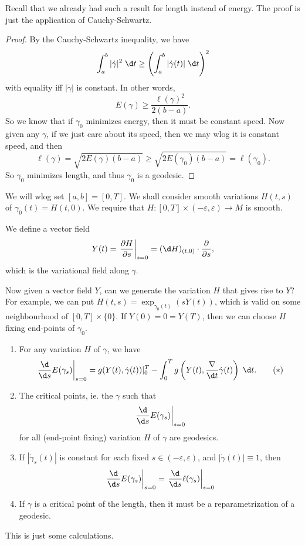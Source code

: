 \documentclass[a4paper]{article}
\begin{document}
Recall that we already had such a result for length instead of energy. The proof is just the application of Cauchy-Schwartz.

\begin{proof}
  By the Cauchy-Schwartz inequality, we have
  \[
    \int_a^b |\dot{\gamma}|^2\; \d t \geq \left(\int_a^b |\dot{\gamma}(t)|\;\d t\right)^2
  \]
  with equality iff $|\dot{\gamma}|$ is constant. In other words,
  \[
    E(\gamma) \geq \frac{\ell(\gamma)^2}{2(b - a)}.
  \]
  So we know that if $\gamma_0$ minimizes energy, then it must be constant speed. Now given any $\gamma$, if we just care about its speed, then we may wlog it is constant speed, and then
  \[
    \ell(\gamma) = \sqrt{2E(\gamma) (b - a) }\geq \sqrt{2 E(\gamma_0) (b - a)} = \ell(\gamma_0).
  \]
  So $\gamma_0$ minimizes length, and thus $\gamma_0$ is a geodesic.
\end{proof}
We will wlog set $[a, b] = [0, T]$. We shall consider smooth variations $H(t, s)$ of $\gamma_0(t) = H(t, 0)$. We require that $H: [0, T] \times (-\varepsilon, \varepsilon) \to M$ is smooth.

We define a vector field
\[
  Y(t) = \left.\frac{\partial H}{\partial s}\right|_{s = 0} = (\d H)_{(t, 0)}\cdot \frac{\partial}{\partial s},
\]
which is the variational field along $\gamma$.

Now given a vector field $Y$, can we generate the variation $H$ that gives rise to $Y$? For example, we can put $H(t, s) = \exp_{\gamma_0(t)} (sY(t))$, which is valid on some neighbourhood of $[0, T] \times \{0\}$. If $Y(0) = 0 = Y(T)$, then we can choose $H$ fixing end-points of $\gamma_0$.

\begin{thm}\leavevmode
  \begin{enumerate}
    \item For any variation $H$ of $\gamma$, we have
      \[
        \left.\frac{\d}{\d s}E(\gamma_s)\right|_{s = 0} = g(Y(t), \dot{\gamma}(t))|_0^T - \int_0^T g\left(Y(t), \frac{\nabla}{\d t} \dot{\gamma}(t)\right)\;\d t.\tag{$*$}
      \]
    \item The critical points, ie. the $\gamma$ such that
      \[
        \left.\frac{\d}{\d s} E(\gamma_s)\right|_{s = 0}
      \]
      for all (end-point fixing) variation $H$ of $\gamma$ are geodesics.
    \item If $|\dot{\gamma}_s(t)|$ is constant for each fixed $s \in (-\varepsilon, \varepsilon)$, and $|\dot{\gamma}(t)| \equiv 1$, then
      \[
        \left.\frac{\d}{\d s}E(\gamma_s) \right|_{s = 0} = \left.\frac{\d}{\d s} \ell(\gamma_s)\right|_{s = 0}
      \]
    \item If $\gamma$ is a critical point of the length, then it must be a reparametrization of a geodesic.
  \end{enumerate}
\end{thm}
This is just some calculations.
\end{document}

